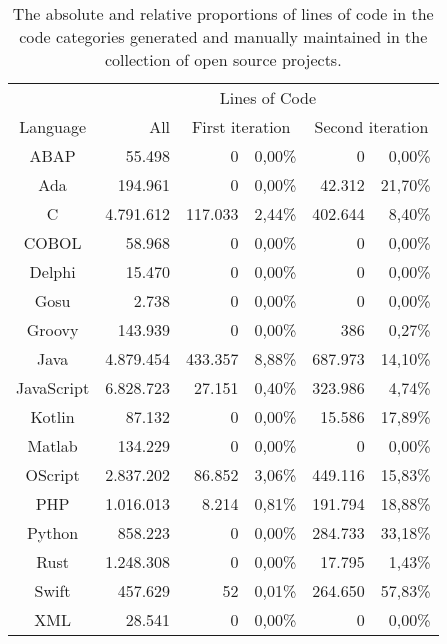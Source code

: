 \setlength{\extrarowheight}{-.0em}
\begin{table}
		\caption[Lines of code distributions in the collection of open source projects.]{The absolute and relative proportions of lines of code in the code categories generated and manually maintained in the collection of open source projects.}
	\label{table:locGit}
	\begin{tabularx}{\textwidth}{c|r|r|r|r|r}
		& \multicolumn{5}{c}{Lines of Code}  \\
		Language & All & \multicolumn{2}{c|}{First iteration} & \multicolumn{2}{c}{Second iteration}  \\
		\hline
		ABAP & 55.498 & 0 & 0,00\% & 0 & 0,00\% \\
		Ada & 194.961 & 0 & 0,00\% & 42.312 & 21,70\% \\
		C & 4.791.612 & 117.033 & 2,44\% & 402.644 & 8,40\% \\
		COBOL & 58.968 & 0 & 0,00\% & 0 & 0,00\% \\
		Delphi & 15.470 & 0 & 0,00\% & 0 & 0,00\% \\
		Gosu & 2.738 & 0 & 0,00\% & 0 & 0,00\% \\
		Groovy & 143.939 & 0 & 0,00\% & 386 & 0,27\% \\
		Java & 4.879.454 & 433.357 & 8,88\% & 687.973 & 14,10\% \\
		JavaScript & 6.828.723 & 27.151 & 0,40\% & 323.986 & 4,74\% \\
		Kotlin & 87.132 & 0 & 0,00\% & 15.586 & 17,89\% \\
		Matlab & 134.229 & 0 & 0,00\% & 0 & 0,00\% \\
		OScript & 2.837.202 & 86.852 & 3,06\% & 449.116 & 15,83\% \\
		PHP & 1.016.013 & 8.214 & 0,81\% & 191.794 & 18,88\% \\
		Python & 858.223 & 0 & 0,00\% & 284.733 & 33,18\% \\
		Rust & 1.248.308 & 0 & 0,00\% & 17.795 & 1,43\% \\
		Swift & 457.629 & 52 & 0,01\% & 264.650 & 57,83\% \\
		XML & 28.541 & 0 & 0,00\% & 0 & 0,00\% \\		
	\end{tabularx}
\end{table}
\setlength{\extrarowheight}{0em}